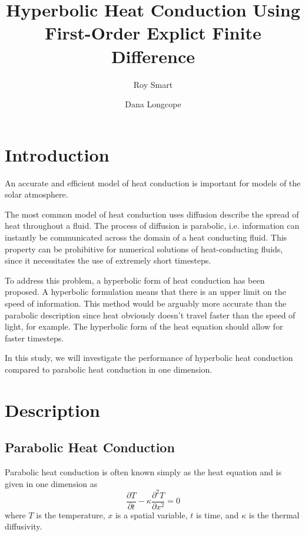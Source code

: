 \documentclass[iop]{emulateapj}
\begin{document}
	
	\title{Hyperbolic Heat Conduction Using First-Order Explict Finite Difference}
	\author{Roy Smart}
	\author{Dana Longcope}
	
	\begin{abstract}
		
	\end{abstract}
	
	\section{Introduction}
	
		\noindent
		An accurate and efficient model of heat conduction is important for models of the solar atmosphere.
		
		The most common model of heat conduction uses diffusion describe the spread of heat throughout a fluid.
			The process of diffusion is parabolic, i.e. information can instantly be communicated across the domain of a heat conducting fluid.
			This property can be prohibitive for numerical solutions of heat-conducting fluids, since it necessitates the use of extremely short timesteps.
			
		To address this problem, a hyperbolic form of heat conduction has been proposed.
			A hyperbolic formulation means that there is an upper limit on the speed of information.
				This method would be arguably more accurate than the parabolic description since heat obviously doesn't travel faster than the speed of light, for example.
			The hyperbolic form of the heat equation should allow for faster timesteps.
			
		In this study, we will investigate the performance of hyperbolic heat conduction compared to parabolic heat conduction in one dimension.
	
	\section{Description}
		\subsection{Parabolic Heat Conduction}
		
			Parabolic heat conduction is often known simply as the heat equation and is given in one dimension as
			\begin{equation} \label{par}
				\frac{\partial T}{\partial t} - \kappa \frac{\partial^2 T}{\partial x^2} = 0
			\end{equation}
			where $T$ is the temperature, $x$ is a spatial variable, $t$ is time, and $\kappa$ is the thermal diffusivity.
\end{document}
